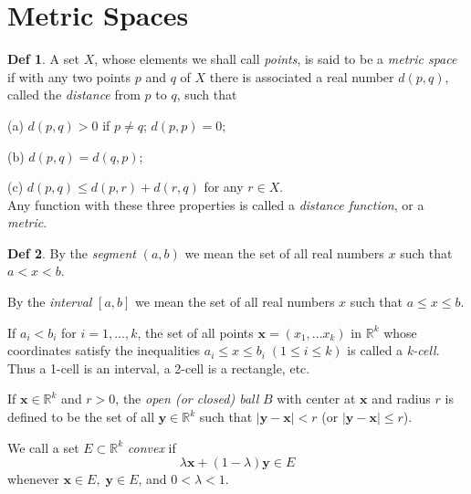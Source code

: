 \documentclass{article}
\theoremstyle{definition}
\newtheorem{definition}{Def}
\begin{document}
\section{Metric Spaces}
\begin{definition}
    A set $X$, whose elements we shall call \textit{points}, is said to be a \textit{metric space} if with any two points $p$ and $q$ of $X$ there is associated a real number $d(p, q)$, called the \textit{distance} from $p$ to $q$, such that\par
    (a) $d(p, q)>0$ if $p\neq q$; $d(p, p)=0$;\par
    (b) $d(p, q)=d(q, p)$;\par
    (c) $d(p, q) \leq d(p, r) + d(r, q)$ for any $r\in X$.\\
    Any function with these three properties is called a \textit{distance function}, or a \textit{metric}.
\end{definition}
\begin{definition}
    By the \textit{segment} $(a, b)$ we mean the set of all real numbers $x$ such that $a<x<b$.\par
    By the \textit{interval} $[a,b]$ we mean the set of all real numbers $x$ such that $a\leq x\leq b$.\par
    If $a_i < b_i$ for $i=1, ..., k$, the set of all points $\textbf{x}=(x_1,...x_k)$ in $\mathbb{R}^k$ whose coordinates satisfy the inequalities $a_i\leq x\leq b_i\;(1\leq i\leq k)$ is called a \textit{k-cell}. Thus a 1-cell is an interval, a 2-cell is a rectangle, etc.\par
    If $\mathbf{x}\in \mathbb{R}^k$ and $r>0$, the \textit{open (or closed) ball} $B$ with center at $\mathbf{x}$ and radius $r$ is defined to be the set of all $\mathbf{y}\in \mathbb{R}^k$ such that $|\mathbf{y}-\mathbf{x}|<r$ (or $|\mathbf{y}-\mathbf{x}|\leq r$).\par
    We call a set $E\subset \mathbb{R}^k$ \textit{convex} if
    \[
    \lambda\mathbf{x}+(1-\lambda)\mathbf{y}\in E
    \]
    whenever $\mathbf{x}\in E,\; \mathbf{y}\in E$, and $0<\lambda<1$.
\end{definition}
\end{document}
